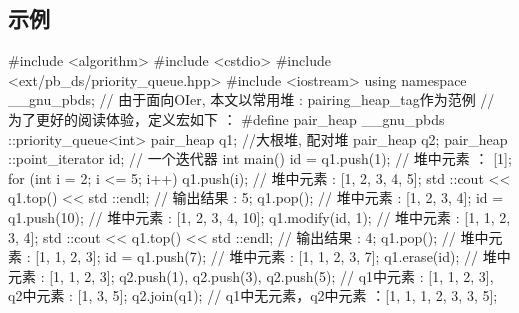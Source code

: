 \subsection{示例}

\begin{cppcode}
#include <algorithm>
#include <cstdio>
#include <ext/pb_ds/priority_queue.hpp>
#include <iostream>
using namespace __gnu_pbds;
// 由于面向OIer, 本文以常用堆 : pairing_heap_tag作为范例
// 为了更好的阅读体验，定义宏如下 ：
#define pair_heap __gnu_pbds ::priority_queue<int>
pair_heap q1;  //大根堆, 配对堆
pair_heap q2;
pair_heap ::point_iterator id;  // 一个迭代器
int main() {
  id = q1.push(1);
  // 堆中元素 ： [1];
  for (int i = 2; i <= 5; i++) q1.push(i);
  // 堆中元素 :  [1, 2, 3, 4, 5];
  std ::cout << q1.top() << std ::endl;
  // 输出结果 : 5;
  q1.pop();
  // 堆中元素 : [1, 2, 3, 4];
  id = q1.push(10);
  // 堆中元素 : [1, 2, 3, 4, 10];
  q1.modify(id, 1);
  // 堆中元素 :  [1, 1, 2, 3, 4];
  std ::cout << q1.top() << std ::endl;
  // 输出结果 : 4;
  q1.pop();
  // 堆中元素 : [1, 1, 2, 3];
  id = q1.push(7);
  // 堆中元素 : [1, 1, 2, 3, 7];
  q1.erase(id);
  // 堆中元素 : [1, 1, 2, 3];
  q2.push(1), q2.push(3), q2.push(5);
  // q1中元素 : [1, 1, 2, 3], q2中元素 : [1, 3, 5];
  q2.join(q1);
  // q1中无元素，q2中元素 ：[1, 1, 1, 2, 3, 3, 5];
}
\end{cppcode}
